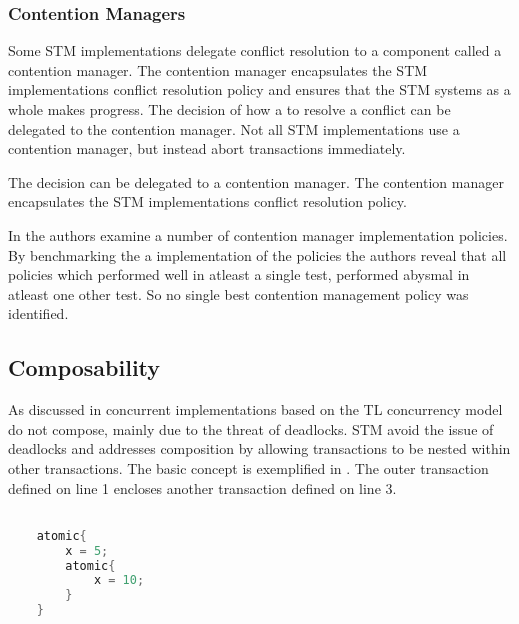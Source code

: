 \subsubsection{Contention Managers}
\label{subsub:con_managers}
Some \ac{STM} implementations delegate conflict resolution to a component called a contention manager\cite[p. 2085]{herlihy2011tm}. The contention manager encapsulates the \ac{STM} implementations conflict resolution policy\cite[p. 2085]{herlihy2011tm} and ensures that the \ac{STM} systems as a whole makes progress\cite[p. 1]{guerraoui2005toward}. The decision of how a to resolve a conflict can be delegated to the contention manager. Not all \ac{STM} implementations use a contention manager, but instead abort transactions immediately\cite[38]{riegel2013software}.

The decision can be delegated to a contention manager. The contention manager encapsulates the \ac{STM} implementations conflict resolution policy\cite[p. 2085]{herlihy2011tm}.

In \cite{scherer2004contention} the authors examine a number of contention manager implementation policies. By benchmarking the a implementation of the policies the authors reveal that all policies which performed well in atleast a single test, performed abysmal in atleast one other test. So no single best contention management policy was identified.

\subsection{Composability}
\label{sec:stm_composability}
As discussed in  concurrent implementations based on the \ac{TL} concurrency model do not compose, mainly due to the threat of deadlocks. \ac{STM} avoid the issue of deadlocks and addresses composition by allowing transactions to be nested within other transactions. The basic concept is exemplified in . The outer transaction defined on line 1 encloses another transaction defined on line 3.

\begin{lstlisting}[label=lst:stm_nested_transactions,
  caption={Nested transactions},
  language=Java,  
  showspaces=false,
  showtabs=false,
  breaklines=true,
  showstringspaces=false,
  breakatwhitespace=true,
  commentstyle=\color{greencomments},
  keywordstyle=\color{bluekeywords},
  stringstyle=\color{redstrings},
  morekeywords={atomic, retry, orElse, var}]  % Start your code-block

	atomic{
		x = 5;
		atomic{
			x = 10;		
		}
	}
       
\end{lstlisting}

